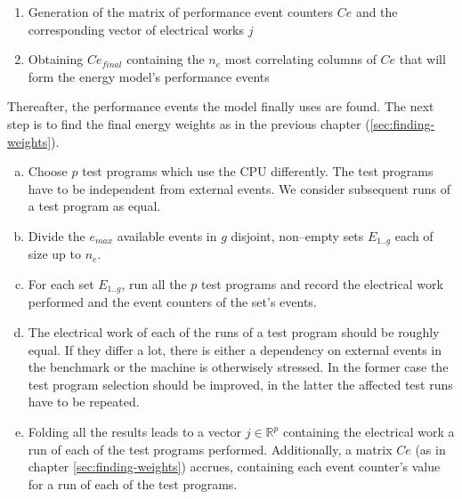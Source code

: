 \begin{enumerate}

\item Generation of the matrix of performance event counters $Ce$ and
the corresponding vector of electrical works $j$

\item Obtaining $Ce_{final}$ containing the $n_e$ most correlating columns of
$Ce$ that will form the energy model's performance events

\end{enumerate}

Thereafter, the performance events the model finally uses are found. The next
step is to find the final energy weights as in the previous chapter
(\ref{sec:finding-weights}).



\begin{enumerate}[(a)]

\item Choose $p$ test programs which use the CPU differently. The test
programs have to be independent from external events. We consider subsequent
runs of a test program as equal.

\item Divide the $e_{max}$ available events in $g$ disjoint, non--empty sets
$E_{1..g}$ each of size up to $n_e$.

\item For each set $E_{1..g}$, run all the $p$ test programs and record the
electrical work performed and the event counters of the set's events.

\item The electrical work of each of the runs of a test program should be
roughly equal. If they differ a lot, there is either a dependency on external
events in the benchmark or the machine is otherwisely stressed. In the former
case the test program selection should be improved, in the latter the affected
test runs have to be repeated.

\item Folding all the results leads to a vector $j \in \mathbb{R}^p$ containing
the electrical work a run of each of the test programs performed. Additionally,
a matrix $Ce$ (as in chapter \ref{sec:finding-weights}) accrues, containing each
event counter's value for a run of each of the test programs.

\end{enumerate}

